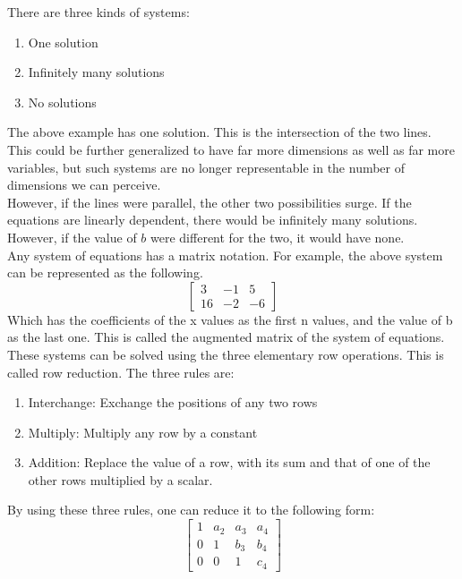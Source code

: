 \documentclass[nobib]{tufte-handout}
\begin{document}
There are three kinds of systems:
\begin{enumerate}
    \item One solution
    \item Infinitely many solutions
    \item No solutions
\end{enumerate}
The above example has one solution. This is the intersection of the two lines. This could be further generalized to have far more dimensions as well as far more variables, but such systems are no longer representable in the number of dimensions we can perceive.\\
However, if the lines were parallel, the other two possibilities surge. If the equations are linearly dependent, there would be infinitely many solutions. However, if the value of $b$ were different for the two, it would have none.\\
Any system of equations has a matrix notation. For example, the above system can be represented as the following.\\
\begin{equation*}
  \begin{bmatrix}
    3 & -1 & 5\\
    16 & -2 & -6
 \end{bmatrix}  
\end{equation*}
Which has the coefficients of the x values as the first n values, and the value of b as the last one. This is called the augmented matrix of the system of equations.\\
These systems can be solved using the three elementary row operations. This is called row reduction.
The three rules are:
\begin{enumerate}
    \item Interchange: Exchange the positions of any two rows
    \item Multiply: Multiply any row by a constant
    \item Addition: Replace the value of a row, with its sum and that of one of the other rows multiplied by a scalar.
\end{enumerate}
By using these three rules, one can reduce it to the following form:
\begin{equation*}
  \begin{bmatrix}
    1 & a_2 & a_3 & a_4\\
    0 & 1 & b_3 & b_4 \\
    0 & 0 & 1 & c_4
 \end{bmatrix}  
\end{equation*}
\end{document}
